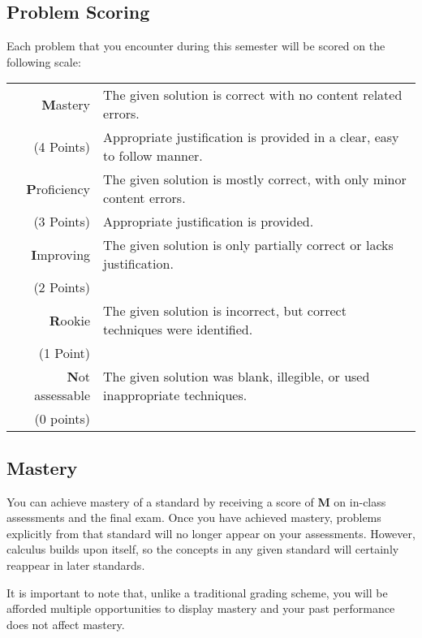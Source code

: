 \documentclass[12pt]{amsart}
\begin{document}
\subsection*{Problem Scoring}
Each problem that you encounter during this semester will be scored on the following scale:
\begin{center}
  \begin{tabular}{|r|l|}
    \hline
    \textbf{M}astery & The given solution is correct with no content related errors.\\
    (4 Points) & Appropriate justification is provided in a clear, easy to follow manner.\\
    \hline
    \textbf{P}roficiency & The given solution is mostly correct, with only minor content errors.\\
    (3 Points) & Appropriate justification is provided.\\
    \hline
    \textbf{I}mproving & The given solution is only partially correct or lacks justification.\\
    (2 Points) & \\
    \hline
    \textbf{R}ookie & The given solution is incorrect, but correct techniques were identified.\\
    (1 Point) & \\
    \hline
    \textbf{N}ot assessable & The given solution was blank, illegible, or used inappropriate techniques. \\
    (0 points) & \\
    \hline
  \end{tabular}
\end{center}

\subsection*{Mastery}
You can achieve mastery of a standard by receiving a score of \textbf{M} on in-class assessments and the final exam.
Once you have achieved mastery, problems explicitly from that standard will no longer appear on your assessments.
However, calculus builds upon itself, so the concepts in any given standard will certainly reappear in later standards.

It is important to note that, unlike a traditional grading scheme, you will be afforded multiple opportunities to display mastery and your past performance does not affect mastery.
\end{document}
